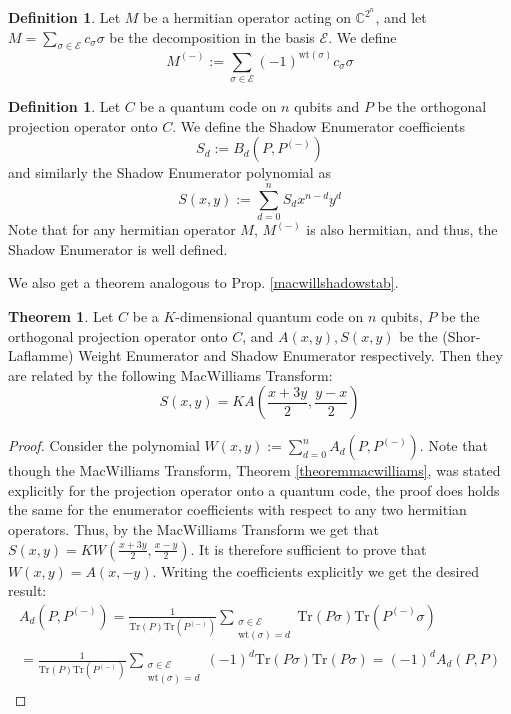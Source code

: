 \documentclass[12pt,a4paper,BCOR15mm,twoside,DIV12]{article}
\def\E{\mathcal{E}}
\def\C{\mathbb{C}}
\def\Tr{\text{Tr}}
\def\wt{\text{wt}}
\theoremstyle{definition}
\newtheorem{theorem}[Satz]{Theorem}
\newtheorem{defn}[Satz]{Definition}
\begin{document}
\begin{defn}
Let $M$ be a hermitian operator acting on $\C^{2^n}$, and let $M = \sum_{\sigma \in \E} c_\sigma \sigma$ be the decomposition in the basis $\E$.
We define 
\begin{equation}M^{(-)}:=  \sum_{\sigma \in \E} (-1)^{\wt(\sigma)} c_\sigma \sigma \end{equation}
\end{defn}

\begin{defn}
Let $C$ be a quantum code on $n$ qubits and $P$ be the orthogonal projection operator onto $C$. We define the Shadow Enumerator coefficients 
\begin{equation} S_d:= B_d(P,P^{(-)}) \end{equation}
 and similarly the Shadow Enumerator polynomial as 
\begin{equation} S(x,y):= \sum_{d=0}^n S_d x^{n-d} y^d \end{equation}
Note that for any hermitian operator $M$, $M^{(-)}$ is also hermitian, and thus, the Shadow Enumerator is well defined.
\end{defn}

We also get a theorem analogous to Prop. \ref{macwillshadowstab}. 

\begin{theorem}\label{macwillshadow}
Let $C$ be a $K$-dimensional quantum code on $n$ qubits, $P$ be the orthogonal projection operator onto $C$, and $A(x,y), S(x,y)$ be the (Shor-Laflamme) Weight Enumerator and Shadow Enumerator respectively. Then they are related by the following MacWilliams Transform:
\begin{equation}
S(x,y) = K A(\frac{x+3y}{2},\frac{y-x}{2})
\end{equation}
\begin{proof}
Consider the polynomial $W(x,y):= \sum_{d=0}^n A_d(P,P^{(-)})$. Note that though the MacWilliams Transform, Theorem \ref{theoremmacwilliams}, was stated explicitly for
the projection operator onto a quantum code, the proof does holds the same for the enumerator coefficients with respect to any two hermitian operators.
 Thus, by the MacWilliams Transform we get that $S(x,y) = K W(\frac{x+3y}{2},\frac{x-y}{2})$. It is therefore sufficient to prove that $W(x,y) = A(x,-y)$. 
Writing the coefficients explicitly we get the desired result:
\begin{align*}
 A_d(P,P^{(-)}) = \frac{1}{\Tr(P) \Tr(P^{(-)})} \sum_{\substack{\sigma \in \E \\ \wt(\sigma) = d}} \Tr(P \sigma) \Tr(P^{(-)} \sigma) \\
= \frac{1}{\Tr(P) \Tr(P^{(-)})} \sum_{\substack{\sigma \in \E \\ \wt(\sigma) = d}} (-1)^d \Tr(P \sigma) \Tr(P \sigma) = (-1)^d A_d(P,P)
\end{align*}
\end{proof}
\end{theorem}
\end{document}
